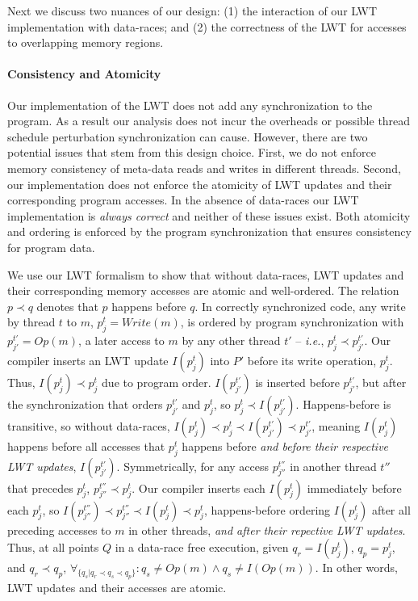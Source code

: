 \documentclass[preprint,9pt]{sigplanconf}
\newcommand{\lwt}{LWT\xspace}
\begin{document}
Next we discuss two nuances of our design: (1) the interaction of our \lwt
implementation with data-races; and (2) the correctness of the
\lwt for accesses to overlapping memory regions. 

\paragraph{Consistency and Atomicity}

Our implementation of the \lwt does not add any synchronization to the program.
As a result our analysis does not incur the overheads or possible thread
schedule perturbation synchronization can cause.  However, there are two
potential issues that stem from this design choice. First, we do not enforce
memory consistency of meta-data reads and writes in different threads.  Second,
our implementation does not enforce the atomicity of \lwt updates and their
corresponding program accesses.  In the absence of data-races our \lwt
implementation is {\em always correct} and neither of these issues exist.  Both
atomicity and ordering is enforced by the program synchronization that ensures
consistency for program data.   

We use our \lwt formalism to show that without data-races, \lwt updates and
their corresponding memory accesses are atomic and well-ordered.  The relation
$p \prec q$ denotes that $p$ happens before $q$.  In correctly synchronized
code, any write by thread $t$ to $m$, $p^{t}_{j} = Write(m)$, is ordered by
program synchronization with $p^{t'}_{j'} = Op(m)$, a later access to $m$ by
any other thread $t'$ -- {\em i.e.}, $p^{t}_{j} \prec p^{t'}_{j'}$.  Our
compiler inserts an \lwt update $I(p^{t}_{j})$ into $P'$ before its write
operation, $p^{t}_{j}$. Thus, $I(p^{t}_{j}) \prec p^{t}_{j}$ due to program
order.  $I(p^{t'}_{j'})$ is inserted before $p^{t'}_{j'}$, but after the synchronization that orders $p^{t'}_{j'}$ and $p^{t}_{j}$, so $p^{t}_{j} \prec I(p^{t'}_{j'})$.  Happens-before is transitive, so without data-races, $I(p^{t}_{j})
\prec p^{t}_{j} \prec I(p^{t'}_{j'}) \prec p^{t'}_{j'}$, meaning $I(p^{t}_{j})$
happens before all accesses that $p^{t}_{j}$ happens before {\em and before
their respective \lwt updates}, $I(p^{t'}_{j'})$.  Symmetrically, for any
access $p^{t''}_{j''}$ in another thread $t''$ that precedes $p^{t}_{j}$,
$p^{t''}_{j''} \prec p^{t}_{j}$.  Our compiler inserts each $I(p^{t}_{j})$
immediately before each $p^{t}_{j}$, so $I(p^{t''}_{j''}) \prec p^{t''}_{j''}
\prec I(p^{t}_{j}) \prec p^{t}_{j}$, happens-before ordering $I(p^{t}_{j})$
after all preceding accesses to $m$ in other threads, {\em and after their
repective \lwt updates}.  Thus, at all points $Q$ in a data-race free
execution, given $q_r = I(p^{t}_{j})$, $q_p = p^{t}_{j}$, and $q_r \prec q_p$,
$\forall_{ \{q_s | q_r \prec q_s \prec q_p \}}: q_s \ne Op(m) \wedge q_s \ne
I(Op(m)) $.  In other words, \lwt updates and their accesses are atomic.
\end{document}
